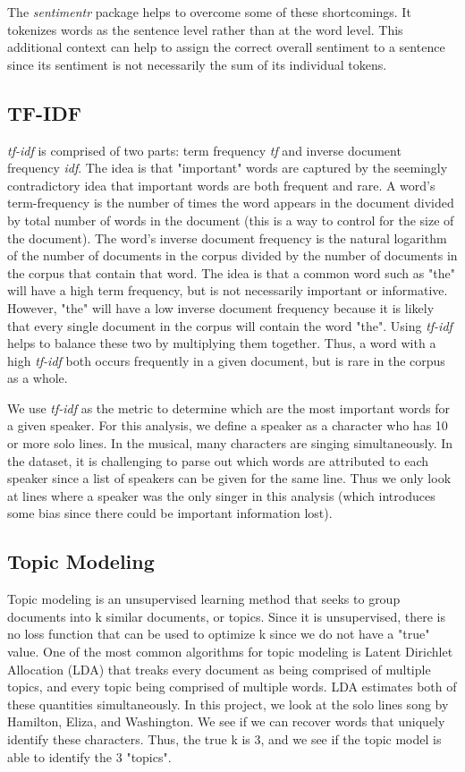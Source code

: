 \documentclass{article}
\begin{document}
The \emph{sentimentr} package helps to overcome some of these shortcomings. It tokenizes words as the sentence level rather than at the word level. This additional context can help to assign the correct overall sentiment to a sentence since its sentiment is not necessarily the sum of its individual tokens. 

\subsection{TF-IDF}
\label{section:tf-idf}

\emph{tf-idf} is comprised of two parts: term frequency \emph{tf} and inverse document frequency \emph{idf}. The idea is that "important" words are captured by the seemingly contradictory idea that important words are both frequent and rare. A word's term-frequency is the number of times the word appears in the document divided by total number of words in the document (this is a way to control for the size of the document). The word's inverse document frequency is the natural logarithm of the number of documents in the corpus divided by the number of documents in the corpus that contain that word. The idea is that a common word such as "the" will have a high term frequency, but is not necessarily important or informative. However, "the" will have a low inverse document frequency because it is likely that every single document in the corpus will contain the word "the". Using \emph{tf-idf} helps to balance these two by multiplying them together. Thus, a word with a high \emph{tf-idf} both occurs frequently in a given document, but is rare in the corpus as a whole. 

We use \emph{tf-idf} as the metric to determine which are the most important words for a given speaker. For this analysis, we define a speaker as a character who has 10 or more solo lines. In the musical, many characters are singing simultaneously. In the dataset, it is challenging to parse out which words are attributed to each speaker since a list of speakers can be given for the same line. Thus we only look at lines where a speaker was the only singer in this analysis (which introduces some bias since there could be important information lost). 

\subsection{Topic Modeling}

Topic modeling is an unsupervised learning method that seeks to group documents into k similar documents, or topics. Since it is unsupervised, there is no loss function that can be used to optimize k since we do not have a "true" value. One of the most common algorithms for topic modeling is Latent Dirichlet Allocation (LDA) that treaks every document as being comprised of multiple topics, and every topic being comprised of multiple words. LDA estimates both of these quantities simultaneously. In this project, we look at the solo lines song by Hamilton, Eliza, and Washington. We see if we can recover words that uniquely identify these characters. Thus, the true k is 3, and we see if the topic model is able to identify the 3 "topics".
\end{document}

